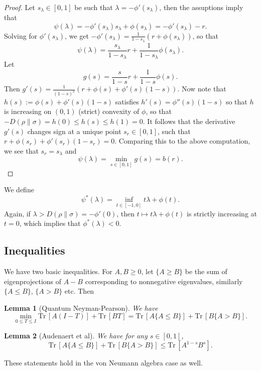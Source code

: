 \documentclass[12pt]{article}
\newtheorem{lemma}{Lemma}
\theoremstyle{definition}
\theoremstyle{remark}
\def \Tr{\mathrm{Tr}\,}
\begin{document}
\begin{proof}
Let $s_\lambda\in [0,1]$ be such that $\lambda=-\phi'(s_\lambda)$, then the assuptions
imply that
\[
\psi(\lambda)=-\phi'(s_\lambda)s_\lambda+\phi(s_\lambda)=-\phi'(s_\lambda)-r.
\]
Solving for $\phi'(s_\lambda)$, we get
$-\phi'(s_\lambda)=\frac1{1-s_\lambda}(r+\phi(s_\lambda))$, so that
\[
\psi(\lambda)=\frac{s_\lambda}{1-s_\lambda}r+\frac1{1-s_\lambda}\phi(s_\lambda).
\]
Let 
\[
g(s)=\frac{s}{1-s}r+\frac1{1-s}\phi(s).
\]
Then $g'(s)=\frac1{(1-s)^2}(r+\phi(s)+\phi'(s)(1-s))$. Now note that
$h(s):=\phi(s)+\phi'(s)(1-s)$ satisfies $h'(s)=\phi''(s)(1-s)$ so that $h$ is increasing
on $(0,1)$ (strict) convexity of $\phi$, so that $-D(\rho\|\sigma)=h(0)\le h(s)\le
h(1)=0$. It follows that the derivative $g'(s)$ changes sign at a unique point $s_r\in [0,1]$, 
such that $r+\phi(s_r)+\phi'(s_r)(1-s_r)=0$. Comparing this to the above computation, we
see that $s_r=s_\lambda$ and 
\[
\psi(\lambda)=\min_{s\in[0,1]} g(s)=b(r).
\]

\end{proof}

We define
\[
\psi^*(\lambda)=\inf_{t\in [-1,0]} t\lambda+\phi(t).
\]
Again, if $\lambda> D(\rho\|\sigma)=-\phi'(0)$, then $t\mapsto t\lambda +\phi(t)$ is
strictly increasing at $t=0$, which implies that $\phi^*(\lambda)<0$. 





\subsection{Inequalities}

We have two basic inequalities. For $A,B\ge 0$, let  $\{A\ge B\}$ be the sum of
eigenprojections of $A-B$ corresponding to nonnegative eigenvalues, similarly $\{A\le
B\}$, $\{A>B\}$ etc. Then 
\begin{lemma}[Quantum Neyman-Pearson]\label{lemma:qnp} We have 
\[
\min_{0\le T\le I} \Tr[A(I-T)]+\Tr[BT]=\Tr[A\{A\le B\}]+\Tr[B\{A>B\}].
\]

\end{lemma}

\begin{lemma}[Audenaert et al]\label{lemma:audenaert} We have for any $s\in [0,1]$, 
\[
\Tr[A\{A\le B\}]+\Tr[B\{A>B\}]\le \Tr[A^{1-s}B^s].
\]

\end{lemma}

These statements hold in the von Neumann algebra case as well.
\end{document}

